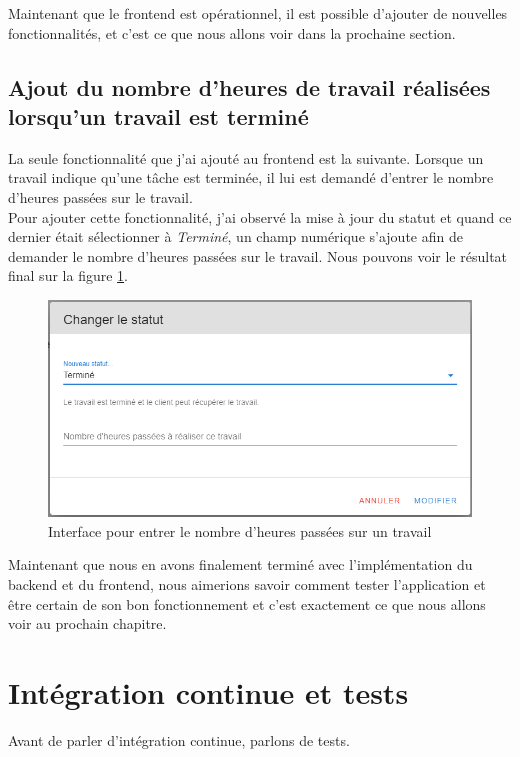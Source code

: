 \documentclass[
    iai, %
    il, %
]{heig-tb}
\begin{document}
Maintenant que le \Gls{frontend} est opérationnel, il est possible d'ajouter de nouvelles fonctionnalités, et c'est ce que nous allons voir dans la prochaine section.

\section{Ajout du nombre d'heures de travail réalisées lorsqu'un travail est terminé}
La seule fonctionnalité que j'ai ajouté au \Gls{frontend} est la suivante. Lorsque un travail indique qu'une tâche est terminée, il lui est demandé d'entrer le nombre d'heures passées sur le travail. \\
Pour ajouter cette fonctionnalité, j'ai observé la mise à jour du statut et quand ce dernier était sélectionner à \emph{Terminé}, un champ numérique s'ajoute afin de demander le nombre d'heures passées sur le travail. Nous pouvons voir le résultat final sur la figure \ref{nb-worked-hours}.

\begin{center}
    \begin{figure}[H]
        \includegraphics[width=\textwidth]{./assets/figures/nb-worked-hours.png}
        \caption{Interface pour entrer le nombre d'heures passées sur un travail \label{nb-worked-hours}}
    \end{figure}
\end{center}

Maintenant que nous en avons finalement terminé avec l'implémentation du \Gls{backend} et du \Gls{frontend}, nous aimerions savoir comment tester l'application et être certain de son bon fonctionnement et c'est exactement ce que nous allons voir au prochain chapitre.

\chapter{Intégration continue et tests}
Avant de parler d'intégration continue, parlons de tests.
\end{document}
